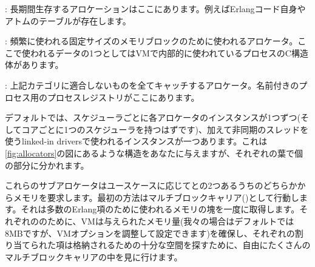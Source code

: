 \begin{enumerate*}
    \item {}: 長期間生存するアロケーションはここにあります。例えばErlangコード自身やアトムのテーブルが存在します。
    \item {}: 頻繁に使われる固定サイズのメモリブロックのために使われるアロケータ。ここで使われるデータの1つとしてはVMで内部的に使われているプロセスのC構造体があります。
    \item {}: 上記カテゴリに適合しないものを全てキャッチするアロケータ。名前付きのプロセス用のプロセスレジストリがここにあります。
\end{enumerate*}

デフォルトでは、スケジューラごとに各アロケータのインスタンスが1つずつ(そしてコアごとに1つのスケジューラを持つはずです)、加えて非同期のスレッドを使うlinked-in driversで使われるインスタンスが一つあります。これは\ref{fig:allocators}の図にあるような構造をあなたに与えますが、それぞれの葉で個の部分に分かれます。

これらのサブアロケータはユースケースに応じてとの2つあるうちのどちらかからメモリを要求します。最初の方法はマルチブロックキャリア()として行動します。それは多数のErlang項のために使われるメモリの塊を一度に取得します。それぞれののために、VMは与えられたメモリ量(我々の場合はデフォルトでは8MBですが、VMオプションを調整して設定できます)を確保し、それぞれの割り当てられた項は格納されるための十分な空間を探すために、自由にたくさんのマルチブロックキャリアの中を見に行けます。

